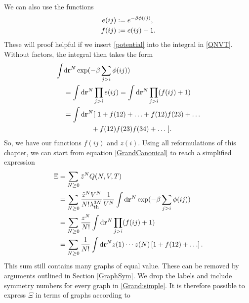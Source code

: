 \documentclass[8.5pt,twoside,twocolumn]{article}
\newcommand\di{\te{d}}
\newcommand\dr{\di\r}
\newcommand\lath{\enmat{\la_\te{th}}}
\renewcommand\r{\bo r}
\theoremstyle{standard}
\begin{document}
We can also use the functions
\begin{equation}
\begin{aligned}
e(ij)&:=e^{-\beta \phi(ij)}, \\
f(ij)&:=e(ij)-1.
\end{aligned}
\label{eijfij}
\end{equation}
These will proof helpful if we insert \eqref{potential} into the integral in \eqref{QNVT}.
Without factors, the integral then takes the form
\begin{equation}
\begin{aligned}
\int&\dr^N \exp(-\be \sum_{j>i} \phi(ij))\\
&= \int\dr^N \prod_{j>i} e(ij)
= \int\dr^N \prod_{j>i} (f(ij)+1)\\
&= \int\dr^N [\ 1+f(12)+\ldots+f(12)f(23)+\ldots\\&\qquad\qquad+f(12)f(23)f(34)+\ldots\ ].
\end{aligned}
\label{int:etof}
\end{equation}
So, we have our functions $f(ij)$ and $z(i)$. Using all reformulations of this chapter, we can
start from equation \eqref{GrandCanonical} to reach a simplified expression
\begin{equation}
\begin{aligned}
\Xi&=\sum_{N\ge0}\tilde z^N Q(N,V,T) \\
&=\sum_{N\ge0} \frac{\tilde z^N V^N}{N!\lath^{3N}} \frac 1 {V^N}\int \dr^N \exp(-\be \sum_{j>i} \phi(ij))\\
&=\sum_{N\ge0} \frac {z^N}{N!} \int\dr^N \prod_{j>i} (f(ij)+1)\\
&=\sum_{N\ge0}\frac 1 {N!} \int\dr^N z(1)\cdots z(N)\lt[1+f(12)+\ldots\rt].
\end{aligned}
\label{Grand:simple}
\end{equation}
This sum still contains many graphs of equal value. These can be removed by arguments outlined
in Section \ref{GraphSym}. We drop the labels and include symmetry numbers for
every graph in \eqref{Grand:simple}. It is therefore possible to express $\Xi$ in terms of graphs according to
\end{document}
